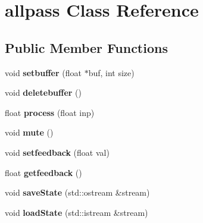 \hypertarget{classallpass}{\section{allpass Class Reference}
\label{classallpass}
}
\subsection*{Public Member Functions}
\begin{DoxyCompactItemize}
\item 
\hypertarget{classallpass_ae107adccefebabb0578dc5b9ad89c5d7}{void {\bfseries setbuffer} (float $\ast$buf, int size)}\label{classallpass_ae107adccefebabb0578dc5b9ad89c5d7}

\item 
\hypertarget{classallpass_a00c687ab45146279654ded860474e368}{void {\bfseries deletebuffer} ()}\label{classallpass_a00c687ab45146279654ded860474e368}

\item 
\hypertarget{classallpass_a72ef1d44f5807011889020f2c316cc32}{float {\bfseries process} (float inp)}\label{classallpass_a72ef1d44f5807011889020f2c316cc32}

\item 
\hypertarget{classallpass_af93a4f1d4dcc544323978031cb234aa6}{void {\bfseries mute} ()}\label{classallpass_af93a4f1d4dcc544323978031cb234aa6}

\item 
\hypertarget{classallpass_ad636d830e21de3dd61928875db95c899}{void {\bfseries setfeedback} (float val)}\label{classallpass_ad636d830e21de3dd61928875db95c899}

\item 
\hypertarget{classallpass_a19e2ab2745647005ce06366b7da64b45}{float {\bfseries getfeedback} ()}\label{classallpass_a19e2ab2745647005ce06366b7da64b45}

\item 
\hypertarget{classallpass_a7110b02ca70f6a56e4d9b11339783b17}{void {\bfseries save\-State} (std\-::ostream \&stream)}\label{classallpass_a7110b02ca70f6a56e4d9b11339783b17}

\item 
\hypertarget{classallpass_a1bcb9cc1309ac57a8eee87ffe4080ce5}{void {\bfseries load\-State} (std\-::istream \&stream)}\label{classallpass_a1bcb9cc1309ac57a8eee87ffe4080ce5}

\end{DoxyCompactItemize}
